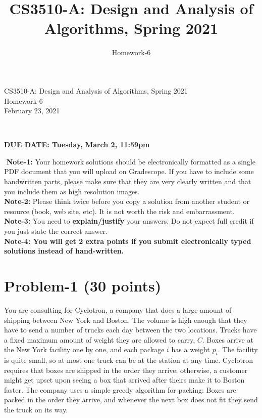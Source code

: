 \documentclass[11pt]{article}
\title{CS3510-A: Design and Analysis of Algorithms, Spring 2021}
\author{Homework-6}
\begin{document}
\begin{center}
    
    \LARGE CS3510-A: Design and Analysis of Algorithms, Spring 2021 \\ \vspace{1em} 
    \large Homework-6 \\ \vspace{0.5em}
    February 23, 2021
\end{center}
\thispagestyle{empty}
\pagestyle{empty}
​
\noindent
\begin{center}
{\bf DUE DATE: Tuesday, March 2, 11:59pm}
\end{center}
​
\noindent
{\bf Note-1:} Your homework solutions should be electronically formatted as a single PDF document that you will upload on Gradescope. 
If you have to include some handwritten parts, please make sure that they are very clearly written and that you include them as high resolution images. \\
​
\noindent
{\bf Note-2:} Please think twice before you copy a solution from another student or resource (book, web site, etc). 
It is not worth the risk and embarrassment. \\
​
\noindent
{\bf Note-3:} You need to {\bf explain/justify} your answers. Do not expect full credit if you just state the correct answer. \\
​
\noindent
{\bf Note-4: You will get 2 extra points if you submit electronically typed solutions instead of hand-written.} 
​
\newpage
\section*{Problem-1 (30 points)}
You are consulting for Cyclotron, a company that does a large amount of shipping between New York and Boston. The volume is high enough that they have to send a number of trucks each day between the two locations. Trucks have a fixed maximum amount of weight they are allowed to carry, $C$. Boxes arrive at the New York facility one by one, and each package $i$ has a weight $p_i$. The facility is quite small, so at most one truck can be at the station at any time. Cyclotron requires that boxes are shipped in the order they arrive; otherwise, a customer might get upset upon seeing a box that arrived after theirs make it to Boston faster. The company uses a simple greedy algorithm for packing: Boxes are packed in the order they arrive, and whenever the next box does not fit they send the truck on its way.
\end{document}
